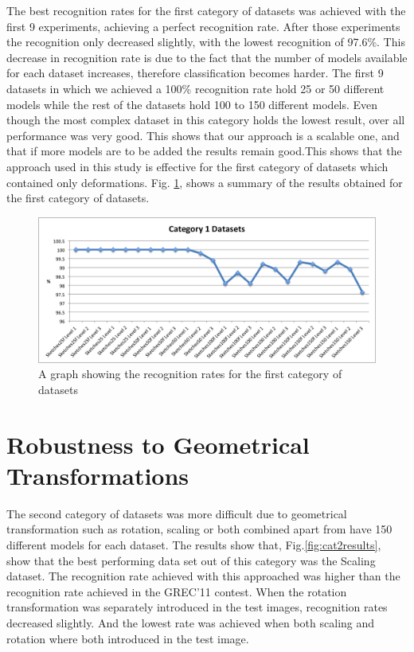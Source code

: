 The best recognition rates for the first category of datasets was achieved with the first 9 experiments, achieving a perfect recognition rate. After those experiments the recognition only decreased slightly, with the lowest recognition of 97.6\%. This decrease in recognition rate is due to the fact that the number of models available for each dataset increases, therefore classification becomes harder. The first 9 datasets in which we achieved a 100\% recognition rate hold 25 or 50 different models while the rest of the datasets hold 100 to 150 different models. Even though the most complex dataset in this category holds the lowest result, over all performance was very good. This shows that our approach is a scalable one, and that if more models are to be added the results remain good.This shows that the approach used in this study is effective for the first category of datasets which contained only deformations. Fig. \ref{fig:cat1results}, shows a summary of the results obtained for the first category of datasets. \\

\begin{figure}[h]
        \centering
        \includegraphics[width=1.0\textwidth]{figures/discussion/results.png}
        \caption[Recognition rates for the first category of datasets]{A graph showing the recognition rates for the first category of datasets}
        \label{fig:cat1results}
\end{figure}


\section{Robustness to Geometrical Transformations}
The second category of datasets was more difficult due to geometrical transformation such as rotation, scaling or both combined apart from have 150 different models for each dataset. The results show that, Fig.\ref{fig:cat2results}, show that the best performing data set out of this category was the Scaling dataset. The recognition rate achieved with this approached was higher than the recognition rate achieved in the GREC'11 contest. When the rotation transformation was separately introduced in the test images, recognition rates decreased slightly. And the lowest rate was achieved when both scaling and rotation where both introduced in the test image.\\

